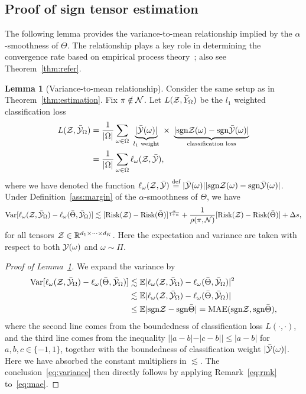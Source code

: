 \documentclass[twoside,11pt]{article}
\theoremstyle{definition}
\newtheorem{lem}{Lemma}
\newcommand*{\KeepStyleUnderBrace}[1]{%
  \mathop{%
    \mathchoice
    {\underbrace{\displaystyle#1}}%
    {\underbrace{\textstyle#1}}%
    {\underbrace{\scriptstyle#1}}%
    {\underbrace{\scriptscriptstyle#1}}%
  }\limits
}
\def\sign{\textup{sgn}}
\begin{document}
\subsection{Proof of sign tensor estimation}
The following lemma provides the variance-to-mean relationship implied by the $\alpha$-smoothness of $\Theta$. The relationship plays a key role in determining the convergence rate based on empirical process theory~\citep{shen1994convergence}; also see Theorem~\ref{thm:refer}.

\begin{lem}[Variance-to-mean relationship]\label{lem:variance}
Consider the same setup as in Theorem~\ref{thm:estimation}. Fix $\pi\notin \mathcal{N}$. Let $L(\mathcal{Z}, \bar Y_\Omega)$ be the $l_1$ weighted classification loss
\begin{align}\label{eq:sample2}
L(\tZ, \bar \tY_\Omega)&= {1\over |\Omega|}\sum_{\omega \in \Omega}\ \KeepStyleUnderBrace{|\bar \tY(\omega)|}_{\text{$l_1$ weight}}\  \times \ \KeepStyleUnderBrace{| \sign \tZ(\omega)-\sign \bar \tY(\omega)|}_{\text{classification loss}}\notag \\
&={1\over |\Omega|}\sum_{\omega \in \Omega}\ell_\omega(\tZ, \bar \tY),
\end{align}
where we have denoted the function $\ell_\omega(\tZ,\bar \tY)\stackrel{\text{def}}{=}|\bar \tY(\omega)||\sign\tZ(\omega)-\sign \bar \tY(\omega)|$. Under Definition~\ref{ass:margin} of the $\alpha$-smoothness of $\Theta$, we have
\begin{equation}\label{eq:variance}
\textup{Var}[\ell_\omega(\mathcal{Z},\bar {\mathcal{Y}}_{\Omega})-\ell_\omega(\bar \Theta, \bar {\mathcal{Y}}_\Omega)]\lesssim [\textup{Risk}(\mathcal{Z})-\textup{Risk}(\bar \Theta)]^{\alpha \over 1+\alpha}+{1\over \rho(\pi, \mathcal{N})}[\textup{Risk}(\mathcal{Z})-\textup{Risk}(\bar \Theta)]+\Delta s,
\end{equation}
for all tensors $\mathcal{Z}\in\mathbb{R}^{d_1\times \cdots \times d_K}$. Here the expectation and variance are taken with respect to both $\mathcal{Y}(\omega)$ and $\omega\sim \Pi$. 
\end{lem}
\begin{proof}[Proof of Lemma~\ref{lem:variance}]
We expand the variance by
\begin{align}\label{eq:mae}
\text{Var}[\ell_\omega(\tZ,\bar \tY_\Omega)-\ell_\omega(\bar \Theta, \bar \tY_\Omega)] &\lesssim \mathbb{E}|\ell_\omega(\tZ,\bar \tY_\Omega)-\ell_\omega(\bar \Theta, \bar \tY_\Omega)|^2\notag \\
&\lesssim \mathbb{E}|\ell_\omega(\tZ,\bar \tY_\Omega)-\ell_\omega(\bar \Theta, \bar \tY_\Omega)|\notag \\
&\leq \mathbb{E}|\sign\tZ-\sign \bar \Theta| = \textup{MAE}(\sign\tZ, \sign \bar \Theta),
\end{align}
where the second line comes from the boundedness of classification loss $L(\cdot ,\cdot)$, and the third line comes from the inequality $||a-b|-|c-b||\leq |a-b|$ for $a,b,c\in\{-1,1\}$, together with the boundedness of classification weight $|\bar{\mathcal{Y}}(\omega)|$. Here we have absorbed the constant multipliers in $\lesssim$. The conclusion~\eqref{eq:variance} then directly follows by applying Remark~\ref{eq:rmk} to~\eqref{eq:mae}.
\end{proof}
\end{document}
